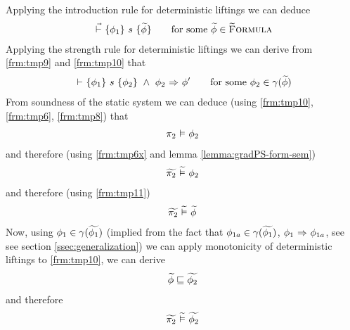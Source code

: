 \begin{proofatend}
\begin{description}
        Applying the introduction rule for deterministic liftings we can deduce
        \begin{align}
        \label{frm:tmp10}
        {} \,\,\vec{\vdash}\,\, \{{\phi_1}\} ~{s}~ \{{\widetilde{\phi}}\}
        \quad\quad\text{for some } \widetilde{\phi} \in \textup{\textsc{\ensuremath{\widetilde{\text{F}}}ormula}}
        \end{align}
        Applying the strength rule for deterministic liftings we can derive from \ref{frm:tmp9} and \ref{frm:tmp10} that
        \begin{align}
        \label{frm:tmp11}
        {} \,\,{\vdash}\,\, \{{\phi_1}\} ~{s}~ \{{\phi_2}\} ~\wedge~ {\phi_2} \,\,{\Rightarrow}\,\, {\phi'}
        \quad\quad\text{for some } \phi_2 \in \gamma(\widetilde{\phi})
        \end{align}
        From soundness of the static system we can deduce (using \ref{frm:tmp10}, \ref{frm:tmp6}, \ref{frm:tmp8}) that
        \begin{align}
        \label{frm:tmp12}
        \pi_2 \,\,{\vDash}\,\, \phi_2
        \end{align}
        and therefore (using \ref{frm:tmp6x} and lemma \ref{lemma:gradPS-form-sem})
        \begin{align}
        \label{frm:tmp14}
        \widetilde{\pi_2} \,\,\widetilde{\vDash}\,\, \phi_2
        \end{align}
        and therefore (using \ref{frm:tmp11})
        \begin{align}
        \label{frm:tmp13}
        \widetilde{\pi_2} \,\,\widetilde{\vDash}\,\, \widetilde{\phi}
        \end{align}
        Now, using $\phi_1 \in \gamma(\widetilde{\phi_1})$ (implied from the fact that $\phi_{1a} \in \gamma(\widetilde{\phi_1})$, ${\phi_1} \,\,{\Rightarrow}\,\, {\phi_{1a}}$, see see section \ref{ssec:generalization}) we can apply monotonicity of deterministic liftings to \ref{frm:tmp10}, we can derive
        \begin{align}
        \label{frm:tmp15}
        \widetilde{\phi} \sqsubseteq \widetilde{\phi_2}
        \end{align}
        and therefore
        \begin{align}
        \label{frm:tmp16}
        \widetilde{\pi_2} \,\,\widetilde{\vDash}\,\, \widetilde{\phi_2}
        \end{align}
    \end{description}
\end{proofatend}

